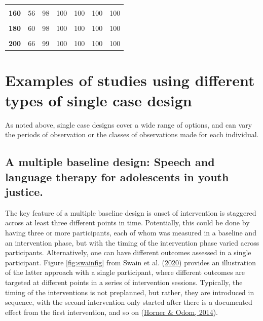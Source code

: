 \documentclass{krantz}
\begin{document}
\begin{table}
\begin{tabular}[t]{>{}ccccccc}
\textbf{\cellcolor{gray!6}{150}} & \cellcolor{gray!6}{52} & \cellcolor{gray!6}{97} & \cellcolor{gray!6}{100} & \cellcolor{gray!6}{100} & \cellcolor{gray!6}{100} & \cellcolor{gray!6}{100}\\
\addlinespace
\textbf{160} & 56 & 98 & 100 & 100 & 100 & 100\\
\textbf{\cellcolor{gray!6}{170}} & \cellcolor{gray!6}{57} & \cellcolor{gray!6}{98} & \cellcolor{gray!6}{100} & \cellcolor{gray!6}{100} & \cellcolor{gray!6}{100} & \cellcolor{gray!6}{100}\\
\textbf{180} & 60 & 98 & 100 & 100 & 100 & 100\\
\textbf{\cellcolor{gray!6}{190}} & \cellcolor{gray!6}{61} & \cellcolor{gray!6}{99} & \cellcolor{gray!6}{100} & \cellcolor{gray!6}{100} & \cellcolor{gray!6}{100} & \cellcolor{gray!6}{100}\\
\textbf{200} & 66 & 99 & 100 & 100 & 100 & 100\\
\bottomrule
\end{tabular}
\end{table}

\hypertarget{examples-of-studies-using-different-types-of-single-case-design}{%
\section{Examples of studies using different types of single case design}\label{examples-of-studies-using-different-types-of-single-case-design}}

As noted above, single case designs cover a wide range of options, and can vary the periods of observation or the classes of observations made for each individual.

\hypertarget{a-multiple-baseline-design-speech-and-language-therapy-for-adolescents-in-youth-justice.}{%
\subsection{A multiple baseline design: Speech and language therapy for adolescents in youth justice.}\label{a-multiple-baseline-design-speech-and-language-therapy-for-adolescents-in-youth-justice.}}

The key feature of a multiple baseline design is onset of intervention is staggered across at least three different points in time. Potentially, this could be done by having three or more participants, each of whom was measured in a baseline and an intervention phase, but with the timing of the intervention phase varied across participants. Alternatively, one can have different outcomes assessed in a single participant. Figure \ref{fig:swainfig} from Swain et al. (\protect\hyperlink{ref-swain2020}{2020}) provides an illustration of the latter approach with a single participant, where different outcomes are targeted at different points in a series of intervention sessions. Typically, the timing of the interventions is not preplanned, but rather, they are introduced in sequence, with the second intervention only started after there is a documented effect from the first intervention, and so on (\protect\hyperlink{ref-horner2014}{Horner \& Odom, 2014}).
\end{document}
